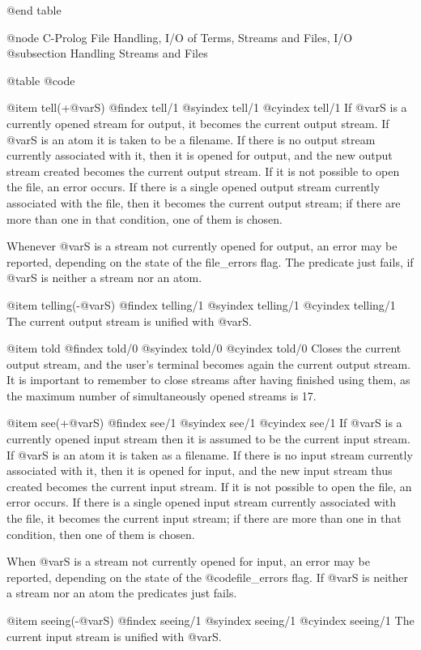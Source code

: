 {{{{{@end table

@node C-Prolog File Handling, I/O of Terms, Streams and Files, I/O
@subsection Handling Streams and Files

@table @code

@item tell(+@var{S})
@findex tell/1
@syindex tell/1
@cyindex tell/1
If @var{S} is a currently opened stream for output, it becomes the
current output stream. If @var{S} is an atom it is taken to be a
filename.  If there is no output stream currently associated with it,
then it is opened for output, and the new output stream created becomes
the current output stream. If it is not possible to open the file, an
error occurs.  If there is a single opened output stream currently
associated with the file, then it becomes the current output stream; if
there are more than one in that condition, one of them is chosen.

Whenever @var{S} is a stream not currently opened for output, an error
may be reported, depending on the state of the file_errors flag. The
predicate just fails, if @var{S} is neither a stream nor an atom.

@item telling(-@var{S})
@findex telling/1
@syindex telling/1
@cyindex telling/1
The current output stream is unified with @var{S}.

@item told
@findex told/0
@syindex told/0
@cyindex told/0
Closes the current output stream, and the user's terminal becomes again
the current output stream. It is important to remember to close streams
after having finished using them, as the maximum number of
simultaneously opened streams is 17.

@item see(+@var{S})
@findex see/1
@syindex see/1
@cyindex see/1
If @var{S} is a currently opened input stream then it is assumed to be
the current input stream. If @var{S} is an atom it is taken as a
filename. If there is no input stream currently associated with it, then
it is opened for input, and the new input stream thus created becomes
the current input stream. If it is not possible to open the file, an
error occurs.  If there is a single opened input stream currently
associated with the file, it becomes the current input stream; if there
are more than one in that condition, then one of them is chosen.

When @var{S} is a stream not currently opened for input, an error may be
reported, depending on the state of the @code{file_errors} flag. If
@var{S} is neither a stream nor an atom the predicates just fails.

@item seeing(-@var{S})
@findex seeing/1
@syindex seeing/1
@cyindex seeing/1
The current input stream is unified with @var{S}.

}}}}}
